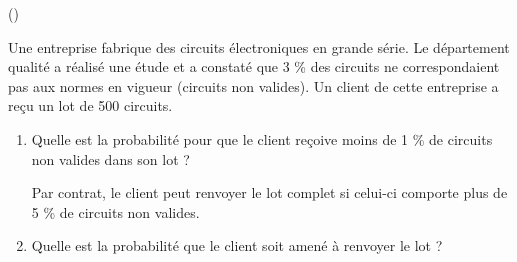 \begin{exercice}\label{exoInf3} (\coolexo)

Une entreprise fabrique des circuits \'electroniques en grande s\'erie. Le d\'epartement qualit\'e a r\'ealis\'e une \'etude et a constat\'e que 3 \%  des circuits ne correspondaient pas aux normes en vigueur (circuits non valides). Un client de cette entreprise a re\c{c}u un lot de 500 circuits. 

\begin{enumerate}

\item Quelle est la probabilit\'e pour que le client re\c{c}oive moins de 1 \%  de circuits non valides dans son lot ?

\bigskip

Par contrat, le client peut renvoyer le lot complet si celui-ci comporte plus de 5 \% de circuits non valides. 

\bigskip

\item Quelle est la probabilit\'e que le client soit amen\'e \`a renvoyer le lot ?

\end{enumerate}


\end{exercice}
